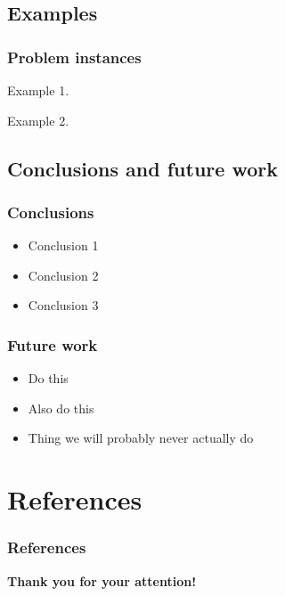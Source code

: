 \documentclass{beamer}
\begin{document}
\subsection{Examples}

\begin{frame}
	\frametitle{Problem instances}

	\begin{example}
		Example 1.
	\end{example}

	\begin{example}
		Example 2.
	\end{example}

\end{frame}

\subsection{Conclusions and future work}

\begin{frame}
	\frametitle{Conclusions}

	\begin{itemize}
		\item Conclusion 1
		\item Conclusion 2
		\item Conclusion 3
	\end{itemize}

\end{frame}

\begin{frame}
	\frametitle{Future work}

	\begin{itemize}
		\item Do this
		\item Also do this
		\item Thing we will probably never actually do
	\end{itemize}

\end{frame}

\section{References}

\begin{frame}[allowframebreaks]
  \frametitle{References}
  \printbibliography
\end{frame}

\begin{frame}[plain]
	\begin{center}
		\textbf{Thank you for your attention!}
	\end{center}
\end{frame}
\end{document}
